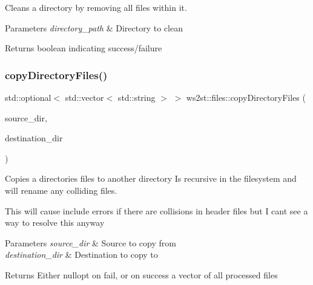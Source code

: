 Cleans a directory by removing all files within it. 


\begin{DoxyParams}{Parameters}
{\em directory\+\_\+path} & Directory to clean \\
\hline
\end{DoxyParams}
\begin{DoxyReturn}{Returns}
boolean indicating success/failure 
\end{DoxyReturn}
\mbox{\label{namespacews2st_1_1files_a64eab5e7433c2cf4f1dc38751b740b48}} 
\subsubsection{\texorpdfstring{copy\+Directory\+Files()}{copyDirectoryFiles()}}
{\footnotesize\ttfamily std\+::optional$<$ std\+::vector$<$ std\+::string $>$ $>$ ws2st\+::files\+::copy\+Directory\+Files (\begin{DoxyParamCaption}\item[{const fs\+::path \&}]{source\+\_\+dir,  }\item[{const fs\+::path \&}]{destination\+\_\+dir }\end{DoxyParamCaption})}



Copies a directories files to another directory Is recursive in the filesystem and will rename any colliding files. 


\begin{DoxyItemize}
\item This will cause include errors if there are collisions in header files but I can\textquotesingle{}t see a way to resolve this anyway 
\begin{DoxyParams}{Parameters}
{\em source\+\_\+dir} & Source to copy from \\
\hline
{\em destination\+\_\+dir} & Destination to copy to \\
\hline
\end{DoxyParams}
\begin{DoxyReturn}{Returns}
Either nullopt on fail, or on success a vector of all processed files 
\end{DoxyReturn}

\end{DoxyItemize}\mbox{\label{namespacews2st_1_1files_ae8e7cbbd08d003dfce48a2e0a8a4c768}} 
